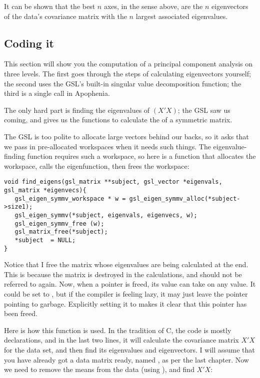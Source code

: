 It can be shown that the best $n$ axes, in the sense above, are the
$n$ eigenvectors of the data's covariance matrix with the $n$ largest
associated eigenvalues.

\subsection{Coding it}
This section will show you the computation of a principal component
analysis on three levels. The first goes through the steps of
calculating eigenvectors yourself; the second uses the 
GSL's built-in singular value decomposition function; the third is a
single call in Apophenia.

The only hard part is finding the eigenvalues of
$(X'X)$; the GSL saw us coming, and gives us the  functions
to calculate the  of a symmetric matrix.

The GSL is too polite to allocate large vectors behind our backs, so
it asks that we pass in pre-allocated workspaces when it needs such
things. The eigenvalue-finding function requires such a workspace, so
here is a function that allocates the workspace, calls the eigenfunction,
then frees the workspace:
\begin{lstlisting}
void find_eigens(gsl_matrix **subject, gsl_vector *eigenvals, gsl_matrix *eigenvecs){
   gsl_eigen_symmv_workspace * w = gsl_eigen_symmv_alloc(*subject->size1);
   gsl_eigen_symmv(*subject, eigenvals, eigenvecs, w);
   gsl_eigen_symmv_free (w);
   gsl_matrix_free(*subject);
   *subject  = NULL;
}
\end{lstlisting}

Notice that I free the matrix whose eigenvalues are being calculated at
the end.  This is because the matrix is destroyed in the calculations,
and should not be referred to again. Now, when a pointer is freed, its value
can take on any value. It could be set to , but if the compiler
is feeling lazy, it may just leave the pointer pointing to garbage.
Explicitly setting it to  makes it clear that this pointer has
been freed.

Here is how this function is used. In the tradition of C, the code is
mostly declarations, and in the last two lines, it will calculate the
covariance matrix $X'X$ for the data set, and then find its eigenvalues
and eigenvectors.  
I will assume that you have already got a data matrix ready, named
, as per the last chapter. Now we need to remove the means
from the data (using ), and find $X'X$:

